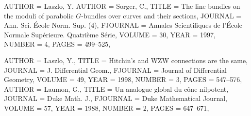 \begin{bibdiv}
\begin{biblist}

 {
    AUTHOR = {Laszlo, Y.}
    AUTHOR = {Sorger, C.},
     TITLE = {The line bundles on the moduli of parabolic {$G$}-bundles over
              curves and their sections},
   JOURNAL = {Ann. Sci. \'{E}cole Norm. Sup. (4)},
  FJOURNAL = {Annales Scientifiques de l'\'{E}cole Normale Sup\'{e}rieure. Quatri\`eme
              S\'{e}rie},
    VOLUME = {30},
      YEAR = {1997},
    NUMBER = {4},
     PAGES = {499--525},
}

 {
    AUTHOR = {Laszlo, Y.},
     TITLE = {Hitchin's and {WZW} connections are the same},
   JOURNAL = {J. Differential Geom.},
  FJOURNAL = {Journal of Differential Geometry},
    VOLUME = {49},
      YEAR = {1998},
    NUMBER = {3},
     PAGES = {547--576},
}
 {
    AUTHOR = {Laumon, G.},
     TITLE = {Un analogue global du c\^one nilpotent},
   JOURNAL = {Duke Math. J.},
  FJOURNAL = {Duke Mathematical Journal},
    VOLUME = {57},
      YEAR = {1988},
    NUMBER = {2},
     PAGES = {647--671},
}


\end{biblist}
\end{bibdiv}
